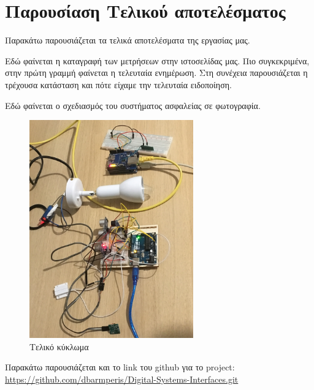 \documentclass[twoside,a4paper]{article}
\begin{document}
\section{Παρουσίαση Τελικού αποτελέσματος}
\begin{flushleft}
\par Παρακάτω παρουσιάζεται τα τελικά αποτελέσματα της εργασίας μας. 



Εδώ φαίνεται η καταγραφή των μετρήσεων στην ιστοσελίδας μας. Πιο συγκεκριμένα, στην πρώτη γραμμή φαίνεται η τελευταία ενημέρωση. Στη συνέχεια παρουσιάζεται η τρέχουσα κατάσταση και πότε είχαμε την τελευταία ειδοποίηση. 
\par Εδώ φαίνεται ο σχεδιασμός του συστήματος ασφαλείας σε φωτογραφία.
\end{flushleft}
\vspace{5mm}
 \begin{figure}[h]
 \includegraphics[width=0.63\textwidth,center]{dev}
 \caption{Τελικό κύκλωμα}
 \end{figure}
 \newpage
 \begin{flushleft}
\par Παρακάτω παρουσιάζεται και το link του github για το project:
\url{https://github.com/dbarmperis/Digital-Systems-Interfaces.git}
 \end{flushleft}
\end{document}
